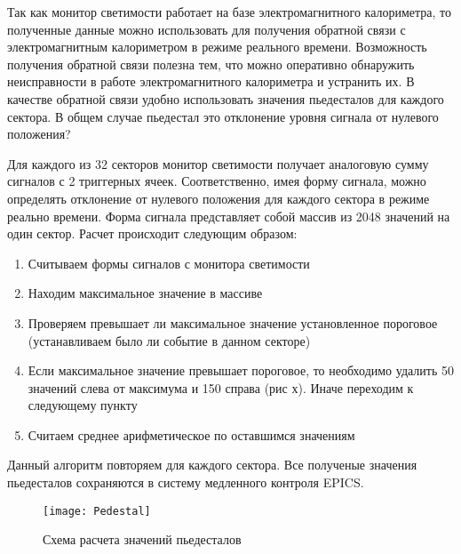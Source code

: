   Так как монитор светимости работает на базе электромагнитного калориметра, то полученные данные можно использовать для получения обратной связи с электромагнитным калориметром в режиме реального времени. Возможность получения обратной связи полезна тем, что можно оперативно обнаружить неисправности в работе электромагнитного калориметра и устранить их. В качестве обратной связи удобно использовать значения пьедесталов для каждого сектора. В общем случае пьедестал это отклонение уровня сигнала от нулевого положения?\par
  Для каждого из 32 секторов монитор светимости получает аналоговую сумму сигналов с 2 триггерных ячеек. Соответственно, имея форму сигнала, можно определять отклонение от нулевого положения для каждого сектора в режиме реально времени. Форма сигнала представляет собой массив из 2048 значений на один сектор. Расчет происходит следующим образом:
\begin{enumerate}
  \item Считываем формы сигналов с монитора светимости
  \item Находим максимальное значение в массиве
  \item Проверяем превышает ли максимальное значение установленное пороговое (устанавливаем было ли событие в данном секторе)
  \item Если максимальное значение превышает пороговое, то необходимо удалить 50 значений слева от максимума и 150 справа (рис х). Иначе переходим к следующему пункту
  \item Считаем среднее арифметическое по оставшимся значениям
\end{enumerate}
Данный алгоритм повторяем для каждого сектора. Все полученые значения пьедесталов сохраняются в систему медленного контроля EPICS.
\begin{figure}[htp]
  \centering
  \texttt{[image: Pedestal]}
  \caption{Схема расчета значений пьедесталов}
  \label{fig:galaxy}
\end{figure}
